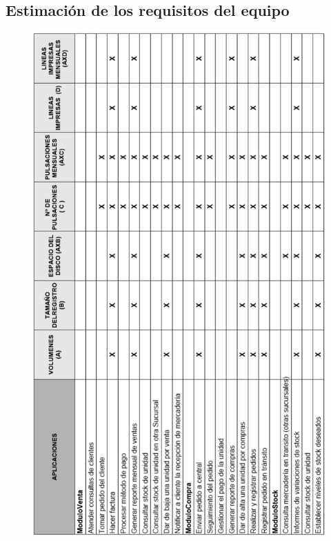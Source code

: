 \subsection{Estimación de los requisitos del equipo}
\clearpage
\thispagestyle{empty}

\addtolength{\oddsidemargin}{-55pt}
\addtolength{\evensidemargin}{-70pt}
\addtolength{\topmargin}{-90pt}

\begin{figure}[!h]
  \includegraphics[width=450px]{fase2/volumenes_datos/volumenes_de_datos.pdf}
\end{figure}

\clearpage

\addtolength{\oddsidemargin}{55pt}
\addtolength{\evensidemargin}{70pt}
\addtolength{\topmargin}{90pt}

